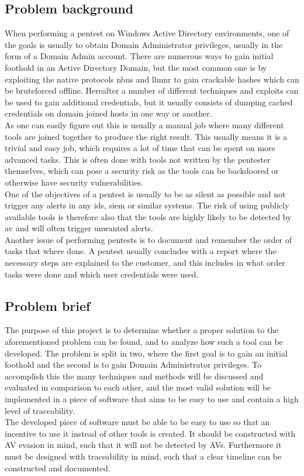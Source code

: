 \documentclass{article}
\begin{document}
\subsection{Problem background}
When performing a pentest on Windows Active Directory environments, one of the goals is usually to obtain Domain Administrator privileges, usually in the form of a Domain Admin account. There are numerous ways to gain initial foothold in an Active Directory Domain, but the most common one is by exploiting the native protocols \gls{nbns} and \gls{llmnr}\cite{url:zero-to-domain-admin} to gain crackable hashes which can be bruteforced offline. Hereafter a number of different techniques and exploits can be used to gain additional credentials, but it usually consists of dumping cached credentials on domain joined hosts in one way or another.
\\
As one can easily figure out this is usually a manual job where many different tools are joined together to produce the right result. This usually means it is a trivial and easy job, which requires a lot of time that can be spent on more advanced tasks. This is often done with tools not written by the pentester themselves, which can pose a security risk as the tools can be backdoored or otherwise have security vulnerabilities.
\\
One of the objectives of a pentest is usually to be as silent as possible and not trigger any alerts in any \gls{ids}, \gls{siem} or similar systems. The risk of using publicly available tools is therefore also that the tools are highly likely to be detected by \gls{av} and will often trigger unwanted alerts.
\\
Another issue of performing pentests is to document and remember the order of tasks that where done. A pentest usually concludes with a report where the necessary steps are explained to the customer, and this includes in what order tasks were done and which user credentials were used.

\subsection{Problem brief}
The purpose of this project is to determine whether a proper solution to the aforementioned problem can be found, and to analyze how such a tool can be developed. The problem is split in two, where the first goal is to gain an initial foothold and the second is to gain Domain Administrator privileges. To accomplish this the many techniques and methods will be discussed and evaluated in comparison to each other, and the most valid solution will be implemented in a piece of software that aims to be easy to use and contain a high level of traceability.
\\
The developed piece of software must be able to be easy to use so that an incentive to use it instead of other tools is created. It should be constructed with AV evasion in mind, such that it will not be detected by AVs. Furthermore it must be designed with traceability in mind, such that a clear timeline can be constructed and documented.
\end{document}
